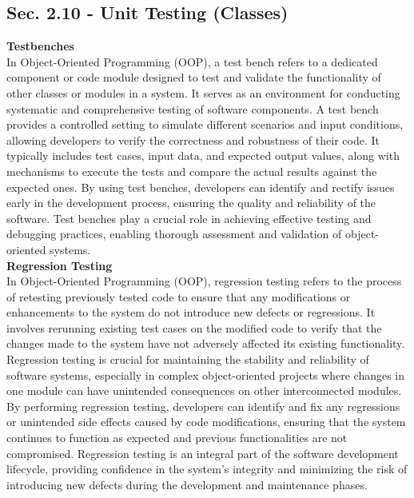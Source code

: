 \subsection*{Sec. 2.10 - Unit Testing (Classes)}
\noindent \textbf{Testbenches} \\

In Object-Oriented Programming (OOP), a test bench refers to a dedicated component or code module designed to test and validate the functionality of other classes or modules in a system. It serves as an environment for conducting systematic and comprehensive 
testing of software components. A test bench provides a controlled setting to simulate different scenarios and input conditions, allowing developers to verify the correctness and robustness of their code. It typically includes test cases, input data, and expected 
output values, along with mechanisms to execute the tests and compare the actual results against the expected ones. By using test benches, developers can identify and rectify issues early in the development process, ensuring the quality and reliability of the 
software. Test benches play a crucial role in achieving effective testing and debugging practices, enabling thorough assessment and validation of object-oriented systems. \\

\noindent \textbf{Regression Testing} \\

In Object-Oriented Programming (OOP), regression testing refers to the process of retesting previously tested code to ensure that any modifications or enhancements to the system do not introduce new defects or regressions. It involves rerunning existing test cases 
on the modified code to verify that the changes made to the system have not adversely affected its existing functionality. Regression testing is crucial for maintaining the stability and reliability of software systems, especially in complex object-oriented projects 
where changes in one module can have unintended consequences on other interconnected modules. By performing regression testing, developers can identify and fix any regressions or unintended side effects caused by code modifications, ensuring that the system continues 
to function as expected and previous functionalities are not compromised. Regression testing is an integral part of the software development lifecycle, providing confidence in the system's integrity and minimizing the risk of introducing new defects during the development 
and maintenance phases. \\

